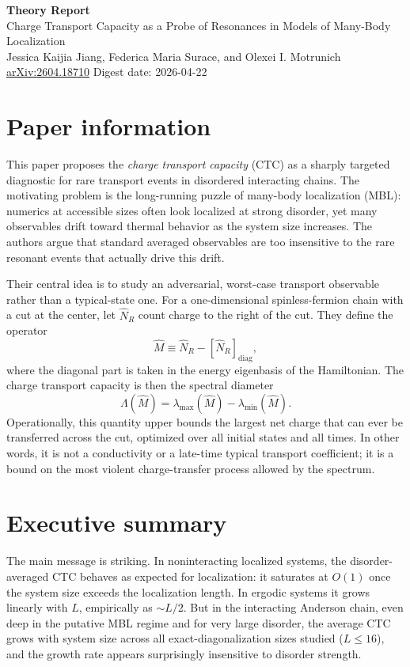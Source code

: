 \documentclass[11pt]{article}
\begin{document}
\begin{center}
{\Large \textbf{Theory Report}}\\[0.4em]
{\large Charge Transport Capacity as a Probe of Resonances in Models of Many-Body Localization}\\[0.5em]
Jessica Kaijia Jiang, Federica Maria Surace, and Olexei I. Motrunich\\
\href{https://arxiv.org/abs/2604.18710}{arXiv:2604.18710} \hspace{1em} Digest date: 2026-04-22
\end{center}

\section*{Paper information}
This paper proposes the \emph{charge transport capacity} (CTC) as a sharply targeted diagnostic for rare transport events in disordered interacting chains. The motivating problem is the long-running puzzle of many-body localization (MBL): numerics at accessible sizes often look localized at strong disorder, yet many observables drift toward thermal behavior as the system size increases. The authors argue that standard averaged observables are too insensitive to the rare resonant events that actually drive this drift.

Their central idea is to study an adversarial, worst-case transport observable rather than a typical-state one. For a one-dimensional spinless-fermion chain with a cut at the center, let $\hat N_R$ count charge to the right of the cut. They define the operator
\[
\hat M \equiv \hat N_R-[\hat N_R]_{\mathrm{diag}},
\]
where the diagonal part is taken in the energy eigenbasis of the Hamiltonian. The charge transport capacity is then the spectral diameter
\[
\Lambda(\hat M)=\lambda_{\max}(\hat M)-\lambda_{\min}(\hat M).
\]
Operationally, this quantity upper bounds the largest net charge that can ever be transferred across the cut, optimized over all initial states and all times. In other words, it is not a conductivity or a late-time typical transport coefficient; it is a bound on the most violent charge-transfer process allowed by the spectrum.

\section*{Executive summary}
The main message is striking. In noninteracting localized systems, the disorder-averaged CTC behaves as expected for localization: it saturates at $O(1)$ once the system size exceeds the localization length. In ergodic systems it grows linearly with $L$, empirically as $\sim L/2$. But in the interacting Anderson chain, even deep in the putative MBL regime and for very large disorder, the average CTC grows with system size across all exact-diagonalization sizes studied ($L\le 16$), and the growth rate appears surprisingly insensitive to disorder strength.
\end{document}
